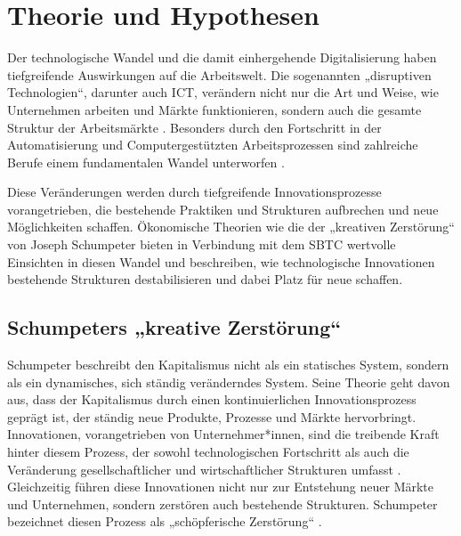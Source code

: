 
\section{Theorie und Hypothesen}

Der technologische Wandel und die damit einhergehende Digitalisierung haben tiefgreifende 
Auswirkungen auf die Arbeitswelt. Die sogenannten „disruptiven Technologien“, darunter auch 
\ac{ICT}, verändern nicht nur die Art und Weise, wie Unternehmen arbeiten und Märkte 
funktionieren, sondern auch die gesamte Struktur der Arbeitsmärkte 
\parencite[S. 27]{brynjolfsson2014thesecond}. Besonders durch den Fortschritt in der 
Automatisierung und Computergestützten Arbeitsprozessen sind zahlreiche Berufe einem 
fundamentalen Wandel unterworfen \parencite[S. 256]{frey2013thefuture}.

Diese Veränderungen werden durch tiefgreifende Innovationsprozesse vorangetrieben, die 
bestehende Praktiken und Strukturen aufbrechen und neue Möglichkeiten schaffen. Ökonomische 
Theorien wie die der „kreativen Zerstörung“ von Joseph Schumpeter 
\parencite[S. 81]{schumpeter1976capitalism} bieten in Verbindung mit dem \ac{SBTC} wertvolle 
Einsichten in diesen Wandel und beschreiben, wie technologische Innovationen bestehende 
Strukturen destabilisieren und dabei Platz für neue schaffen.


\subsection{Schumpeters „kreative Zerstörung“}

Schumpeter beschreibt den Kapitalismus nicht als ein statisches System, sondern als ein 
dynamisches, sich ständig veränderndes System. \parencite[S. 82]{schumpeter1976capitalism} 
Seine Theorie geht davon aus, dass der Kapitalismus durch einen kontinuierlichen 
Innovationsprozess geprägt ist, der ständig neue Produkte, Prozesse und Märkte hervorbringt. 
Innovationen, vorangetrieben von Unternehmer*innen, sind die treibende Kraft hinter diesem 
Prozess, der sowohl technologischen Fortschritt als auch die Veränderung gesellschaftlicher 
und wirtschaftlicher Strukturen umfasst \parencite[S. 82]{schumpeter1976capitalism}. 
Gleichzeitig führen diese Innovationen nicht nur zur Entstehung neuer Märkte und 
Unternehmen, sondern zerstören auch bestehende Strukturen. Schumpeter bezeichnet diesen 
Prozess als „schöpferische Zerstörung“ \parencite[S. 103ff]{schumpeter1976capitalism}.

